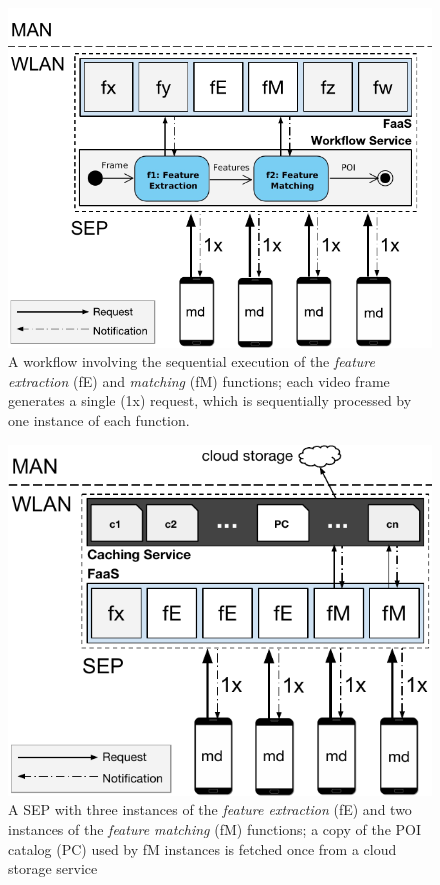 

\begin{figure}[bp]
	\centering
	\includegraphics[width=1\linewidth]{Figs/Mobile_Computation_Offloading_Workflow.pdf}
	\caption{A workflow involving the sequential execution of the \textit{feature extraction} (fE) and \textit{matching} (fM) functions; each video frame generates a single (1x) request, which is sequentially processed by one instance of each function.} 
	\label{fig:Mobile_Computation_Offloading_Workflow}
\end{figure}

\begin{figure}[tbp]
	\centering
	\includegraphics[width=0.97\linewidth]{Figs/Mobile_Computation_Offloading_Caching.pdf}
	\caption{A SEP with three instances of the \textit{feature extraction} (fE) and two instances of the \textit{feature matching} (fM) functions; a copy of the POI catalog (PC) used by fM instances is fetched once from a cloud storage service} 
	\label{fig:Mobile_Computation_Offloading_Caching}
\end{figure}

